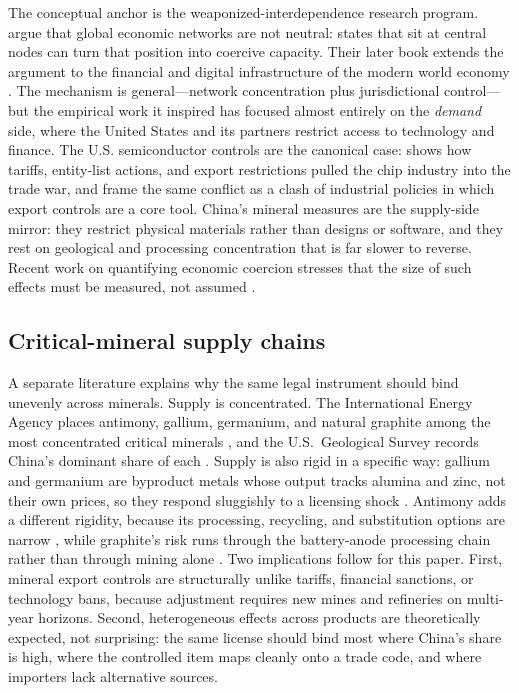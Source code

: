 \documentclass[12pt,a4paper]{article}
\begin{document}
The conceptual anchor is the weaponized-interdependence research program.
\citet{farrellnewman-2019-weaponizedinterdependencehow} argue that global
economic networks are not neutral: states that sit at central nodes can turn
that position into coercive capacity. Their later book extends the argument to
the financial and digital infrastructure of the modern world economy
\citep{farrell2023underground_empire}. The mechanism is general---network
concentration plus jurisdictional control---but the empirical work it inspired
has focused almost entirely on the \emph{demand} side, where the United States
and its partners restrict access to technology and finance. The U.S.
semiconductor controls are the canonical case: \citet{bown-2020-howunitedstates}
shows how tariffs, entity-list actions, and export restrictions pulled the chip
industry into the trade war, and \citet{bown2024semiconductors} frame the same
conflict as a clash of industrial policies in which export controls are a core
tool. China's mineral measures are the supply-side mirror: they restrict
physical materials rather than designs or software, and they rest on geological
and processing concentration that is far slower to reverse. Recent work on
quantifying economic coercion stresses that the size of such effects must be
measured, not assumed \citep{eggeretal-2024-analyzingeffectseconomic}.

\subsection{Critical-mineral supply chains}

A separate literature explains why the same legal instrument should bind
unevenly across minerals. Supply is concentrated. The International Energy
Agency places antimony, gallium, germanium, and natural graphite among the most
concentrated critical minerals \citep{iea_2025_global_critical_minerals_outlook},
and the U.S.\ Geological Survey records China's dominant share of each
\citep{usgs_2026_antimony, usgs_2026_gallium, usgs_2026_germanium,
usgs_2026_graphite_natural}. Supply is also rigid in a specific way: gallium and
germanium are byproduct metals whose output tracks alumina and zinc, not their
own prices, so they respond sluggishly to a licensing shock
\citep{frenzel2017byproduct_metals}. Antimony adds a different rigidity, because
its processing, recycling, and substitution options are narrow
\citep{vandenbrink2022antimony_resilience, xu2025antimony_material_flow}, while
graphite's risk runs through the battery-anode processing chain rather than
through mining alone \citep{park2025graphite_supply_chain}. Two implications
follow for this paper. First, mineral export controls are structurally unlike
tariffs, financial sanctions, or technology bans, because adjustment requires
new mines and refineries on multi-year horizons. Second, heterogeneous effects
across products are theoretically expected, not surprising: the same license
should bind most where China's share is high, where the controlled item maps
cleanly onto a trade code, and where importers lack alternative sources.
\end{document}
